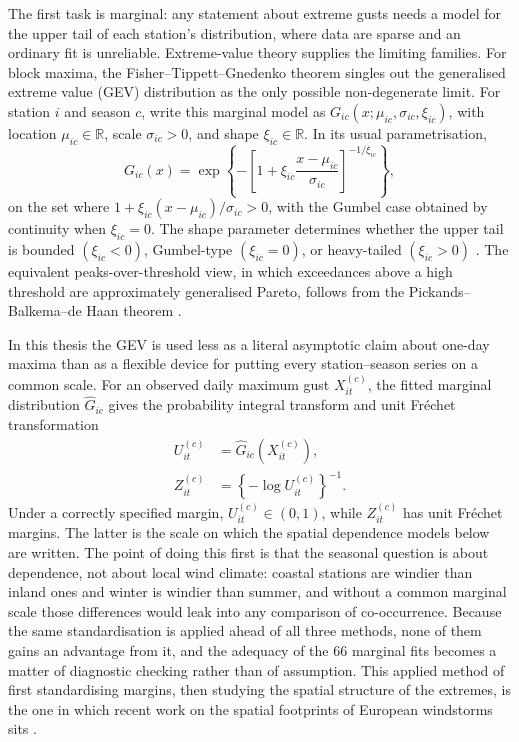 The first task is marginal: any statement about extreme gusts needs a model for the upper tail of each station's distribution, where data are sparse and an ordinary fit is unreliable. Extreme-value theory supplies the limiting families. For block maxima, the Fisher--Tippett--Gnedenko theorem singles out the generalised extreme value (GEV) distribution as the only possible non-degenerate limit. For station \(i\) and season \(c\), write this marginal model as \(G_{ic}(x;\mu_{ic},\sigma_{ic},\xi_{ic})\), with location \(\mu_{ic}\in\mathbb R\), scale \(\sigma_{ic}>0\), and shape \(\xi_{ic}\in\mathbb R\). In its usual parametrisation,
\[
    G_{ic}(x)
    =
    \exp\left\{
    -\left[
        1+\xi_{ic}\frac{x-\mu_{ic}}{\sigma_{ic}}
        \right]^{-1/\xi_{ic}}
    \right\},
\]
on the set where \(1+\xi_{ic}(x-\mu_{ic})/\sigma_{ic}>0\), with the Gumbel case obtained by continuity when \(\xi_{ic}=0\). The shape parameter determines whether the upper tail is bounded \((\xi_{ic}<0)\), Gumbel-type \((\xi_{ic}=0)\), or heavy-tailed \((\xi_{ic}>0)\) \citep{fisher1928,gnedenko1943}. The equivalent peaks-over-threshold view, in which exceedances above a high threshold are approximately generalised Pareto, follows from the Pickands--Balkema--de Haan theorem \citep{pickands1975,balkema1974}.

In this thesis the GEV is used less as a literal asymptotic claim about one-day maxima than as a flexible device for putting every station--season series on a common scale. For an observed daily maximum gust \(X_{it}^{(c)}\), the fitted marginal distribution \(\widehat G_{ic}\) gives the probability integral transform and unit Fr\'echet transformation
\begin{equation}\label{eq:pit-unit-frechet}
    \begin{aligned}
        U_{it}^{(c)}
         & =
        \widehat G_{ic}\left(X_{it}^{(c)}\right),
        \\
        Z_{it}^{(c)}
         & =
        \left\{-\log U_{it}^{(c)}\right\}^{-1}.
    \end{aligned}
\end{equation}
Under a correctly specified margin, \(U_{it}^{(c)}\in(0,1)\), while \(Z_{it}^{(c)}\) has unit Fr\'echet margins. The latter is the scale on which the spatial dependence models below are written. The point of doing this first is that the seasonal question is about dependence, not about local wind climate: coastal stations are windier than inland ones and winter is windier than summer, and without a common marginal scale those differences would leak into any comparison of co-occurrence. Because the same standardisation is applied ahead of all three methods, none of them gains an advantage from it, and the adequacy of the \(66\) marginal fits becomes a matter of diagnostic checking rather than of assumption. This applied method of first standardising margins, then studying the spatial structure of the extremes, is the one in which recent work on the spatial footprints of European windstorms sits \citep{sharkey2020,pacey2021,gliksman2023european}.



